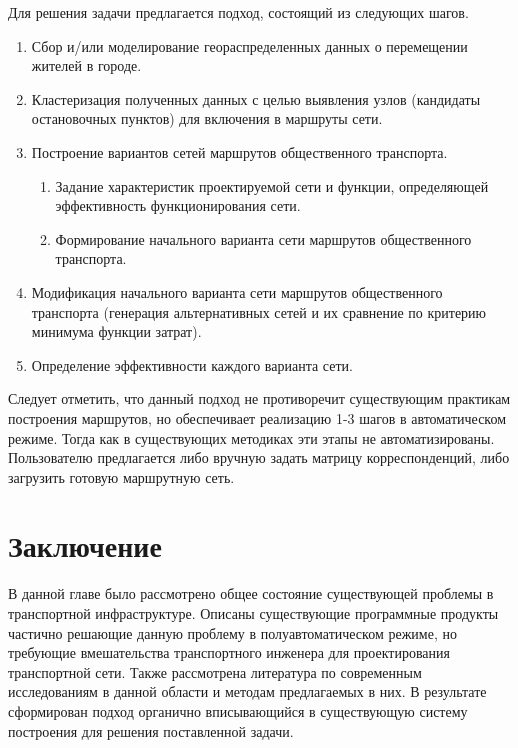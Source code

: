 Для решения задачи предлагается подход, состоящий из следующих шагов. 
\begin{enumerate}
    \item Сбор и/или моделирование геораспределенных данных о перемещении жителей в городе.
    \item Кластеризация полученных данных с целью выявления узлов (кандидаты остановочных пунктов) для 
        включения в маршруты сети.
    \item Построение вариантов сетей маршрутов общественного транспорта.
    \begin{enumerate}
        \item Задание характеристик проектируемой сети и функции, определяющей эффективность 
            функционирования сети.
        \item Формирование начального варианта сети маршрутов общественного транспорта.
    \end{enumerate}
    \item Модификация начального варианта сети маршрутов общественного транспорта (генерация 
        альтернативных сетей и их сравнение по критерию минимума функции затрат).
    \item Определение эффективности каждого варианта сети.
\end{enumerate}
Следует отметить, что данный подход не противоречит существующим практикам построения маршрутов, но 
обеспечивает реализацию 1-3 шагов в автоматическом режиме. Тогда как в существующих методиках \cite{bib:9} 
эти этапы не автоматизированы. Пользователю предлагается либо вручную задать матрицу корреспонденций, 
либо загрузить готовую маршрутную сеть.

\section{Заключение}
В данной главе было рассмотрено общее состояние существующей проблемы в транспортной инфраструктуре. 
Описаны существующие программные продукты частично решающие данную проблему в полуавтоматическом режиме, но 
требующие вмешательства транспортного инженера для проектирования транспортной сети. Также рассмотрена 
литература по современным исследованиям в данной области и методам предлагаемых в них. В результате 
сформирован подход органично вписывающийся в существующую систему построения для решения поставленной задачи.